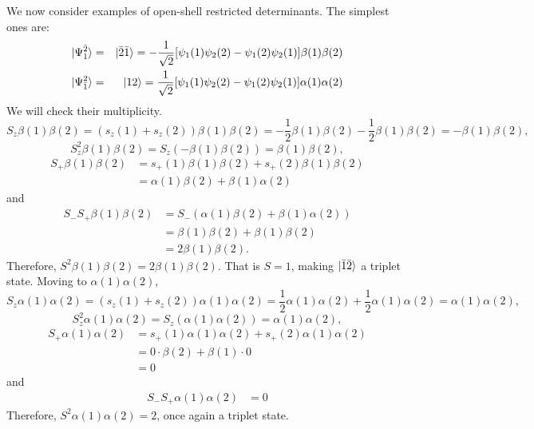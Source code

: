 We now consider examples of open-shell restricted determinants. The simplest
ones are:
\begin{eqnarray}
\ket{\Psi_1^{\bar{2}}} &=& \ket{\bar{2}\bar{1}} = -\frac{1}{\sqrt{2}}
  [\psi_1(1)\psi_2(2) - \psi_1(2)\psi_2(1)]\beta(1)\beta(2) \label{c2e164}\\
\ket{\Psi_{\bar{1}}^2} &=& \ket{12} = \frac{1}{\sqrt{2}}
  [\psi_1(1)\psi_2(2) - \psi_1(2)\psi_2(1)]\alpha(1)\alpha(2) \label{c2e165}
\end{eqnarray}
We will check their multiplicity.
\[
S_z\beta(1)\beta(2) = (s_z(1) + s_z(2))\beta(1)\beta(2) =
-\frac{1}{2}\beta(1)\beta(2) -\frac{1}{2}\beta(1)\beta(2) = -\beta(1)\beta(2),
\]
\[
S_z^2\beta(1)\beta(2) = S_z(-\beta(1)\beta(2)) = \beta(1)\beta(2),
\]
\[
\begin{aligned}
S_+\beta(1)\beta(2) &= s_+(1)\beta(1)\beta(2) + s_+(2)\beta(1)\beta(2) \\
 &= \alpha(1)\beta(2) + \beta(1)\alpha(2)
\end{aligned}
\]
and
\[
\begin{aligned}
S_-S_+\beta(1)\beta(2) &= S_-( \alpha(1)\beta(2) + \beta(1)\alpha(2)) \\
 &= \beta(1)\beta(2) + \beta(1)\beta(2) \\
 &= 2\beta(1)\beta(2).
\end{aligned}
\]
Therefore, $S^2\beta(1)\beta(2) = 2\beta(1)\beta(2)$. That is $S = 1$, making
$\ket{\bar{1}\bar{2}}$ a triplet state. Moving to $\alpha(1)\alpha(2)$,
\[
S_z\alpha(1)\alpha(2) = (s_z(1) + s_z(2))\alpha(1)\alpha(2) =
\frac{1}{2}\alpha(1)\alpha(2) + \frac{1}{2}\alpha(1)\alpha(2) = \alpha(1)\alpha(2),
\]
\[
S_z^2\alpha(1)\alpha(2) = S_z(\alpha(1)\alpha(2)) = \alpha(1)\alpha(2),
\]
\[
\begin{aligned}
S_+\alpha(1)\alpha(2) &= s_+(1)\alpha(1)\alpha(2) + s_+(2)\alpha(1)\alpha(2) \\
 &= 0\cdot\beta(2) + \beta(1)\cdot 0 \\
 &= 0
\end{aligned}
\]
and
\[
\begin{aligned}
S_-S_+\alpha(1)\alpha(2) &= 0 
\end{aligned}
\]
Therefore, $S^2\alpha(1)\alpha(2) = 2$, once again a triplet state.

